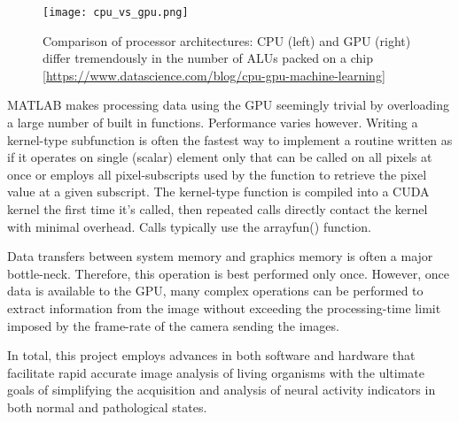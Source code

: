 \documentclass[../main.tex]{subfiles}
\begin{document}
\begin{figure}[b]
\centering
\texttt{[image: cpu\_vs\_gpu.png]}
\caption[Comparison of processor architectures]{Comparison of processor architectures: CPU (left) and GPU (right) differ tremendously in the number of ALUs packed on a chip [\url{https://www.datascience.com/blog/cpu-gpu-machine-learning}]}
\label{fig:gpu-comparison}
\end{figure}

MATLAB makes processing data using the GPU seemingly trivial by overloading a large number of built in functions.
Performance varies however.
Writing a kernel-type subfunction is often the fastest way to implement a routine written as if it operates on single (scalar) element only that can be called on all pixels at once or employs all pixel-subscripts used by the function to retrieve the pixel value at a given subscript.
The kernel-type function is compiled into a CUDA kernel the first time it's called, then repeated calls directly contact the kernel with minimal overhead.
Calls typically use the arrayfun() function.

Data transfers between system memory and graphics memory is often a major bottle-neck.
Therefore, this operation is best performed only once.
However, once data is available to the GPU, many complex operations can be performed to extract information from the image without exceeding the processing-time limit imposed by the frame-rate of the camera sending the images.

In total, this project employs advances in both software and hardware that facilitate rapid accurate image analysis of living organisms with the ultimate goals of simplifying the acquisition and analysis of neural activity indicators in both normal and pathological states.

\clearpage
\end{document}
